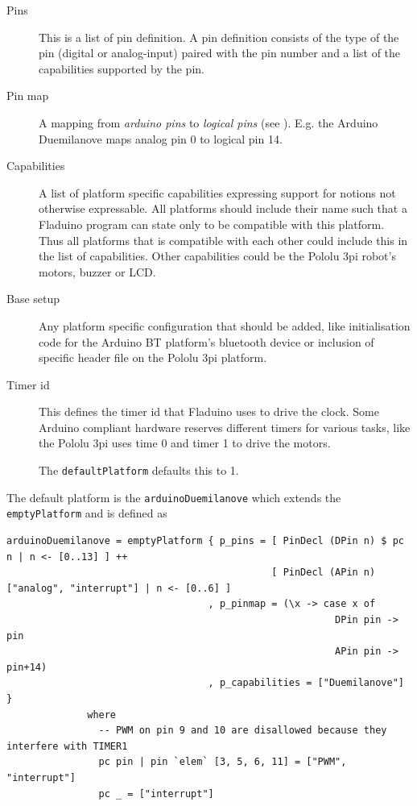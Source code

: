 \documentclass[a4paper, oneside, final]{memoir}
\let\Fref\undefined
\begin{document}
\begin{description}
\item[Pins] This is a list of pin definition. A pin definition
  consists of the type of the pin (digital or analog-input) paired
  with the pin number and a list of the capabilities supported by the
  pin.

\item[Pin map] A mapping from \textit{arduino pins} to
  \textit{logical pins} (see \Fref{sec:pins}).  E.g. the Arduino
  Duemilanove maps analog pin 0 to logical pin 14.

\item[Capabilities] A list of platform specific capabilities
  expressing support for notions not otherwise expressable.  All
  platforms should include their name such that a Fladuino program can
  state only to be compatible with this platform. Thus all platforms
  that is compatible with each other could include this in the list of
  capabilities. Other capabilities could be the Pololu 3pi robot's
  motors, buzzer or LCD.

\item[Base setup] Any platform specific configuration that should be
  added, like initialisation code for the Arduino BT platform's
  bluetooth device or inclusion of specific header file on the Pololu
  3pi platform.

\item[Timer id] This defines the timer id that Fladuino uses to drive
  the clock. Some Arduino compliant hardware reserves different timers
  for various tasks, like the Pololu 3pi uses time 0 and timer 1 to
  drive the motors.

  The \texttt{defaultPlatform} defaults this to 1.
\end{description}

The default platform is the \texttt{arduinoDuemilanove} which extends the
\texttt{emptyPlatform} and is defined as

\begin{verbatim}
arduinoDuemilanove = emptyPlatform { p_pins = [ PinDecl (DPin n) $ pc n | n <- [0..13] ] ++
                                              [ PinDecl (APin n) ["analog", "interrupt"] | n <- [0..6] ]
                                   , p_pinmap = (\x -> case x of
                                                         DPin pin -> pin
                                                         APin pin -> pin+14)
                                   , p_capabilities = ["Duemilanove"] }
              where
                -- PWM on pin 9 and 10 are disallowed because they interfere with TIMER1
                pc pin | pin `elem` [3, 5, 6, 11] = ["PWM", "interrupt"] 
                pc _ = ["interrupt"]
\end{verbatim}
\end{document}
